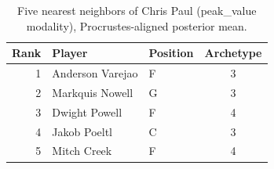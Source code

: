 \begin{table}[htbp]
  \centering\small
  \begin{tabular}{rllc}
    \toprule
    Rank & Player & Position & Archetype \\
    \midrule
    1 & Anderson Varejao & F & 3 \\
    2 & Markquis Nowell & G & 3 \\
    3 & Dwight Powell & F & 4 \\
    4 & Jakob Poeltl & C & 3 \\
    5 & Mitch Creek & F & 4 \\
    \bottomrule
  \end{tabular}
  \caption{Five nearest neighbors of Chris Paul (peak_value modality), Procrustes-aligned posterior mean.}
  \label{tab:Chris_Paul_neighbors_peak_value}
\end{table}

